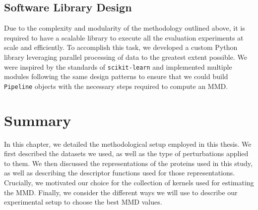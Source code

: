 \subsection{Software Library Design}

Due to the complexity and modularity of the methodology outlined above, it is
required to have a scalable library to execute all the evaluation experiments at
scale and efficiently. To accomplish this task, we developed a custom Python
library leveraging parallel processing of data to the greatest extent possible.
We were inspired by the standards of \texttt{scikit-learn} and implemented
multiple modules following the same design patterns to ensure that we could
build \texttt{Pipeline} objects with the necessary steps required to compute an
MMD.


\section{Summary}

In this chapter, we detailed the methodological setup employed in this thesis.
We first described the datasets we used, as well as the type of perturbations
applied to them. We then discussed the representations of the proteins used in
this study, as well as describing the descriptor functions used for those
representations. Crucially, we motivated our choice for the collection of
kernels used for estimating the MMD. Finally, we consider the different ways we
will use to describe our experimental setup to choose the best MMD values.
